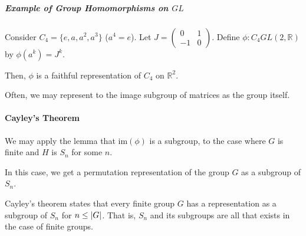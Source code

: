 \subparagraph{Example of Group Homomorphisms on \(GL\)}
Consider \(C_4 = \{e, a, a^2, a^3\}\) (\(a^4 = e\)).
Let \(J = \begin{pmatrix}
        0  & 1 \\
        -1 & 0
    \end{pmatrix}.
\)
Define \(\phi: C_4 GL(2, \mathbb{R})\) by
\(\phi(a^k) = J^k\).

Then, \(\phi\) is a faithful representation of \(C_4\) on \(\mathbb{R}^2\).

Often, we may represent to the image subgroup of matrices as the group
itself.

\paragraph{Cayley's Theorem}
We may apply the lemma that \(\textrm{im}(\phi)\) is a subgroup, to the
case where \(G\) is finite and \(H\) is \(S_n\) for some \(n\).

In this case, we get a permutation representation of the group \(G\)
as a subgroup of \(S_n\).

Cayley's theorem states that every finite group \(G\) has a representation
as a subgroup of \(S_n\) for \(n \leq \abs{G}\).
That is, \(S_n\) and its subgroups are all that exists in the case of
finite groups.


